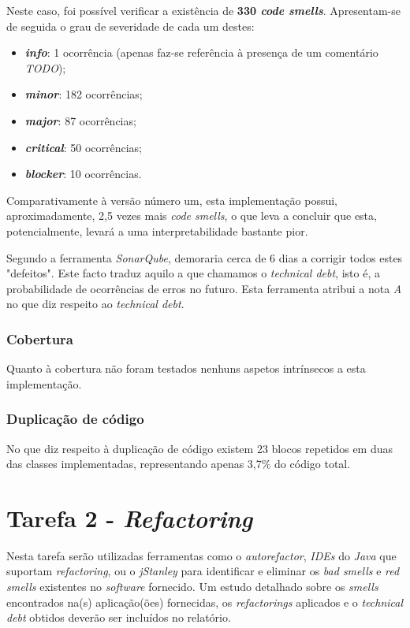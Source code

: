 \documentclass[a4paper]{report}
\begin{document}
Neste caso, foi possível verificar a existência de \textbf{330 \textit{code smells}}. Apresentam-se de seguida o grau de severidade de cada um destes:
\begin{itemize}
    \item \textbf{\textit{info}}: 1 ocorrência (apenas faz-se referência à presença de um comentário \textit{TODO});
    \item \textbf{\textit{minor}}: 182 ocorrências;
    \item \textbf{\textit{major}}: 87 ocorrências;
    \item \textbf{\textit{critical}}: 50 ocorrências;
    \item \textbf{\textit{blocker}}: 10 ocorrências.
\end{itemize}

Comparativamente à versão número um, esta implementação possui, aproximadamente, 2,5 vezes mais \textit{code smells}, o que leva a concluir que esta, potencialmente, levará a uma interpretabilidade bastante pior.

Segundo a ferramenta \textit{SonarQube}, demoraria cerca de 6 dias a corrigir todos estes "defeitos". Este facto traduz aquilo a que chamamos o \textit{technical debt}, isto é, a probabilidade de ocorrências de erros no futuro. Esta ferramenta atribui a nota \textit{A} no que diz respeito ao \textit{technical debt}.

\subsubsection{Cobertura}
Quanto à cobertura não foram testados nenhuns aspetos intrínsecos a esta implementação.

\subsubsection{Duplicação de código}
No que diz respeito à duplicação de código existem 23 blocos repetidos em duas das classes implementadas, representando apenas 3,7\% do código total.

\section{Tarefa 2 - \textit{Refactoring}}
Nesta tarefa serão utilizadas ferramentas como o \textit{autorefactor}, \textit{IDEs} do \textit{Java} que suportam \textit{refactoring}, ou o \textit{jStanley} para identificar e eliminar os \textit{bad smells} e \textit{red smells} existentes no \textit{software} fornecido. Um estudo detalhado sobre os \textit{smells} encontrados na(s) aplicação(ões) fornecidas, os \textit{refactorings} aplicados e o \textit{technical debt} obtidos deverão ser incluídos no relatório.
\end{document}
